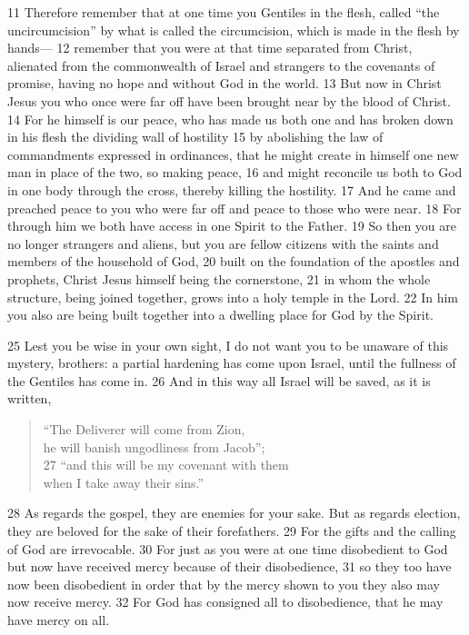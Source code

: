 \begin{bible}
11 Therefore remember that at one time you Gentiles in the flesh, called ``the uncircumcision'' by what is called the circumcision, which is made in the flesh by hands— 12 remember that you were at that time separated from Christ, alienated from the commonwealth of Israel and strangers to the covenants of promise, having no hope and without God in the world. 13 But now in Christ Jesus you who once were far off have been brought near by the blood of Christ. 14 For he himself is our peace, who has made us both one and has broken down in his flesh the dividing wall of hostility 15 by abolishing the law of commandments expressed in ordinances, that he might create in himself one new man in place of the two, so making peace, 16 and might reconcile us both to God in one body through the cross, thereby killing the hostility. 17 And he came and preached peace to you who were far off and peace to those who were near. 18 For through him we both have access in one Spirit to the Father. 19 So then you are no longer strangers and aliens, but you are fellow citizens with the saints and members of the household of God, 20 built on the foundation of the apostles and prophets, Christ Jesus himself being the cornerstone, 21 in whom the whole structure, being joined together, grows into a holy temple in the Lord. 22 In him you also are being built together into a dwelling place for God by the Spirit.


25 Lest you be wise in your own sight, I do not want you to be unaware of this mystery, brothers: a partial hardening has come upon Israel, until the fullness of the Gentiles has come in. 26 And in this way all Israel will be saved, as it is written,
\begin{quote}
``The Deliverer will come from Zion,\\
    he will banish ungodliness from Jacob'';\\
27 ``and this will be my covenant with them\\
    when I take away their sins.''
\end{quote}
28 As regards the gospel, they are enemies for your sake. But as regards election, they are beloved for the sake of their forefathers. 29 For the gifts and the calling of God are irrevocable. 30 For just as you were at one time disobedient to God but now have received mercy because of their disobedience, 31 so they too have now been disobedient in order that by the mercy shown to you they also may now receive mercy. 32 For God has consigned all to disobedience, that he may have mercy on all.



\end{bible}
